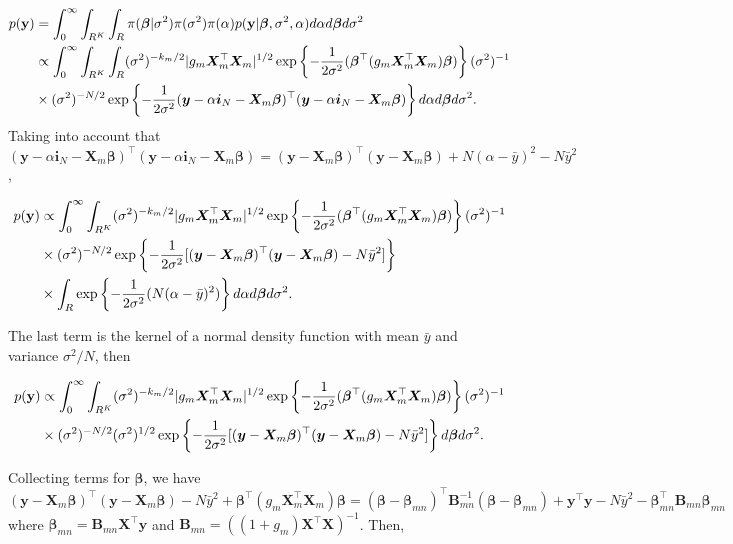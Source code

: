 \begin{enumerate}[leftmargin=*]
\begin{align*}
	p({\bf{y}})&=\int_0^{\infty}\int_{R^K}\int_R\pi (\bm{\beta} | \sigma^2)\pi(\sigma^2)\pi(\alpha)p({\bf{y}}|\bm{\beta}, \sigma^2, \alpha)d\alpha d\bm{\beta} d\sigma^2\\
	&\propto \int_0^{\infty}\int_{R^K}\int_R (\sigma^2)^{-k_m/2} |g_m\bm{X}_m^{\top}\bm{X}_m|^{1/2}\exp\left\{-\frac{1}{2\sigma^2}(\bm{\beta}^{\top}(g_m\bm{X}_m^{\top}\bm{X}_m)\bm{\beta})\right\}(\sigma^2)^{-1}\\
	&\times (\sigma^2)^{-N/2}\exp\left\{-\frac{1}{2\sigma^2}(\bm{y}-\alpha\bm{i}_N-\bm{X}_m\bm{\beta})^{\top}(\bm{y}-\alpha\bm{i}_N-\bm{X}_m\bm{\beta})\right\}d\alpha d\bm{\beta} d\sigma^2.
\end{align*}
Taking into account that $(\bm{y}-\alpha\bm{i}_N-\bm{X}_m\bm{\beta})^{\top}(\bm{y}-\alpha\bm{i}_N-\bm{X}_m\bm{\beta})=(\bm{y}-\bm{X}_m\bm{\beta})^{\top}(\bm{y}-\bm{X}_m\bm{\beta})+N(\alpha-\bar{y})^2-N\bar{y}^2$, 

\begin{align*}
	p({\bf{y}})	&\propto \int_0^{\infty}\int_{R^K} (\sigma^2)^{-k_m/2} |g_m\bm{X}_m^{\top}\bm{X}_m|^{1/2}\exp\left\{-\frac{1}{2\sigma^2}(\bm{\beta}^{\top}(g_m\bm{X}_m^{\top}\bm{X}_m)\bm{\beta})\right\}(\sigma^2)^{-1}\\
	&\times (\sigma^2)^{-N/2}\exp\left\{-\frac{1}{2\sigma^2}[(\bm{y}-\bm{X}_m\bm{\beta})^{\top}(\bm{y}-\bm{X}_m\bm{\beta})-N\bar{y}^2]\right\}\\
	&\times \int_R \exp\left\{-\frac{1}{2\sigma^2}(N(\alpha-\bar{y})^2)\right\} d\alpha d\bm{\beta} d\sigma^2.
\end{align*}

The last term is the kernel of a normal density function with mean $\bar{y}$ and variance $\sigma^2/N$, then

\begin{align*}
	p({\bf{y}})	&\propto \int_0^{\infty}\int_{R^K} (\sigma^2)^{-k_m/2} |g_m\bm{X}_m^{\top}\bm{X}_m|^{1/2}\exp\left\{-\frac{1}{2\sigma^2}(\bm{\beta}^{\top}(g_m\bm{X}_m^{\top}\bm{X}_m)\bm{\beta})\right\}(\sigma^2)^{-1}\\
	&\times (\sigma^2)^{-N/2}(\sigma^2)^{1/2}\exp\left\{-\frac{1}{2\sigma^2}[(\bm{y}-\bm{X}_m\bm{\beta})^{\top}(\bm{y}-\bm{X}_m\bm{\beta})-N\bar{y}^2]\right\}d\bm{\beta} d\sigma^2.
\end{align*}

Collecting terms for $\bm{\beta}$, we have $(\bm{y}-\bm{X}_m\bm{\beta})^{\top}(\bm{y}-\bm{X}_m\bm{\beta})-N\bar{y}^2+\bm{\beta}^{\top}(g_m\bm{X}_m^{\top}\bm{X}_m)\bm{\beta}=(\bm{\beta}-\bm{\beta}_{mn})^{\top}\bm{B}_{mn}^{-1}(\bm{\beta}-\bm{\beta}_{mn})+\bm{y}^{\top}\bm{y}-N\bar{y}^2-\bm{\beta}_{mn}^{\top}\bm{B}_{mn}\bm{\beta}_{mn}$ where $\bm{\beta}_{mn}=\bm{B}_{mn}\bm{X}^{\top}\bm{y}$ and $\bm{B}_{mn}=((1+g_m)\bm{X}^{\top}\bm{X})^{-1}$. Then,


\end{enumerate}
